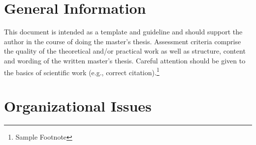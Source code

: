 \section{General Information}

This document is intended as a template and guideline and should support the author in the course of doing the master's thesis.
Assessment criteria comprise the quality of the theoretical and/or practical work as well as structure, content and wording of the written master's thesis. Careful attention should be given to the basics of scientific work (e.g., correct citation).\footnote{Sample Footnote}

\section{Organizational Issues}

